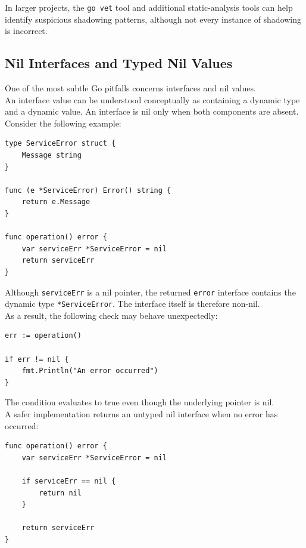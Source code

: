 In larger projects, the \texttt{go vet} tool and additional static-analysis tools can help identify suspicious shadowing patterns, although not every instance of shadowing is incorrect.\\

\subsection{Nil Interfaces and Typed Nil Values}

One of the most subtle Go pitfalls concerns interfaces and nil values.\\

An interface value can be understood conceptually as containing a dynamic type and a dynamic value. An interface is nil only when both components are absent.\\

Consider the following example:

\begin{lstlisting}
type ServiceError struct {
    Message string
}

func (e *ServiceError) Error() string {
    return e.Message
}

func operation() error {
    var serviceErr *ServiceError = nil
    return serviceErr
}
\end{lstlisting}

Although \texttt{serviceErr} is a nil pointer, the returned \texttt{error} interface contains the dynamic type \texttt{*ServiceError}. The interface itself is therefore non-nil.\\

As a result, the following check may behave unexpectedly:

\begin{lstlisting}
err := operation()

if err != nil {
    fmt.Println("An error occurred")
}
\end{lstlisting}

The condition evaluates to true even though the underlying pointer is nil.\\

A safer implementation returns an untyped nil interface when no error has occurred:

\begin{lstlisting}
func operation() error {
    var serviceErr *ServiceError = nil

    if serviceErr == nil {
        return nil
    }

    return serviceErr
}
\end{lstlisting}

